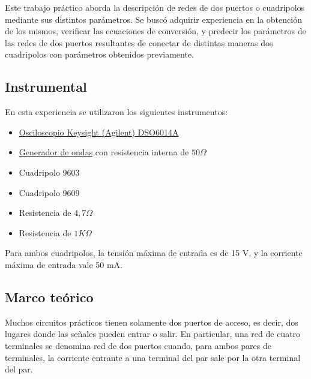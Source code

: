 Este trabajo práctico aborda la descripción de redes de dos puertos o cuadripolos mediante sus distintos
parámetros. Se buscó adquirir experiencia en la obtención de los mismos,
verificar las ecuaciones de conversión, y predecir los parámetros de las redes de dos puertos resultantes
de conectar de distintas maneras dos cuadripolos con parámetros obtenidos previamente.

\subsection{Instrumental}
        En esta experiencia se utilizaron los siguientes instrumentos:
\begin{itemize}
  \item \href{https://www.rftesolutions.com/index.php?main_page=product_info&products_id=729}{Osciloscopio Keysight (Agilent) DSO6014A}
  \item \href{https://www.keysight.com/us/en/product/EDU33212A/waveform-generator-20mhz-2-channel.html}{Generador de ondas}  con 
        resistencia interna de $ 50 \Omega $ %
  \item Cuadripolo 9603
  \item Cuadripolo 9609
  \item Resistencia de $ 4,7 \Omega $
  \item Resistencia de $ 1 K\Omega $
\end{itemize}
Para ambos cuadripolos, la tensión máxima de entrada es de 15 V, y la corriente máxima de entrada vale 50 mA.

\subsection{Marco teórico}
Muchos circuitos prácticos tienen solamente dos puertos de acceso, es decir, dos lugares donde las
señales pueden entrar o salir. En particular, una red de cuatro terminales se denomina red de dos
puertos cuando, para ambos pares de terminales, la corriente entrante a una terminal del par sale
por la otra terminal del par. \par

